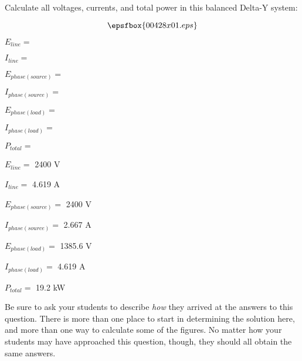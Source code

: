 

Calculate all voltages, currents, and total power in this balanced Delta-Y system:

$$\epsfbox{00428x01.eps}$$

\medskip
\item{} $E_{line} =$
\item{} $I_{line} =$
\item{} $E_{phase(source)} =$
\item{} $I_{phase(source)} =$
\item{} $E_{phase(load)} =$
\item{} $I_{phase(load)} =$
\item{} $P_{total} =$
\medskip







\medskip
\item{} $E_{line} =$ 2400 V
\item{} $I_{line} =$ 4.619 A
\item{} $E_{phase(source)} =$ 2400 V
\item{} $I_{phase(source)} =$ 2.667 A
\item{} $E_{phase(load)} =$ 1385.6 V
\item{} $I_{phase(load)} =$ 4.619 A
\item{} $P_{total} =$ 19.2 kW
\medskip







Be sure to ask your students to describe {\it how} they arrived at the answers to this question.  There is more than one place to start in determining the solution here, and more than one way to calculate some of the figures.  No matter how your students may have approached this question, though, they should all obtain the same answers.




